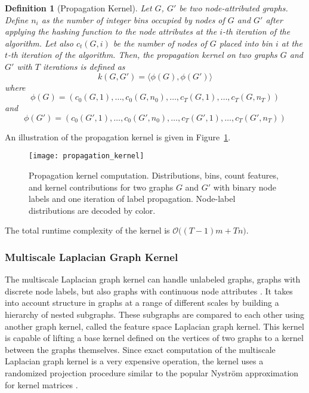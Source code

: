 \documentclass[twoside,11pt]{article}
\newtheorem{definition}{Definition}
\begin{document}
\begin{definition}[Propagation Kernel]
  Let $G$, $G'$ be two node-attributed graphs.
  Define $n_i$ as the number of integer bins occupied by nodes of $G$ and $G'$ after applying the hashing function to the node attributes at the $i$-th iteration of the algorithm.
  Let also $c_t(G, i)$ be the number of nodes of $G$ placed into bin $i$ at the $t$-th iteration of the algorithm.
  Then, the propagation kernel on two graphs $G$ and $G'$ with $T$ iterations is defined as
  \begin{equation}
    k(G,G') = \langle \phi(G),\phi(G') \rangle 
  \end{equation}
  where
  \begin{equation}
    \phi(G) = (c_0(G, 1),\ldots,c_0(G, n_0),\ldots,c_T(G, 1),\ldots,c_T(G, n_T))
  \end{equation}
  and
  \begin{equation}
    \phi(G') = (c_0(G', 1),\ldots,c_0(G', n_0),\ldots,c_T(G', 1),\ldots,c_T(G', n_T))
  \end{equation}
\end{definition}
An illustration of the propagation kernel is given in Figure~\ref{fig:propagation_kernel}.
\begin{figure}[t]
  \centering
  \texttt{[image: propagation\_kernel]}
  \caption{Propagation kernel computation. Distributions, bins, count features, and kernel contributions for two graphs $G$ and $G'$ with binary node labels and one iteration of label propagation. Node-label distributions are decoded by color.}
  \label{fig:propagation_kernel}
\end{figure}
The total runtime complexity of the kernel is $\mathcal{O}\big((T-1)m+Tn\big)$.


\subsubsection{Multiscale Laplacian Graph Kernel}
The multiscale Laplacian graph kernel can handle unlabeled graphs, graphs with discrete node labels, but also graphs with continuous node attributes .
It takes into account structure in graphs at a range of different scales by building a hierarchy of nested subgraphs.
These subgraphs are compared to each other using another graph kernel, called the feature space Laplacian graph kernel.
This kernel is capable of lifting a base kernel defined on the vertices of two graphs to a kernel between the graphs themselves.
Since exact computation of the multiscale Laplacian graph kernel is a very expensive operation, the kernel uses a randomized projection procedure  similar to the popular Nystr{\"o}m approximation for kernel matrices .
\end{document}

